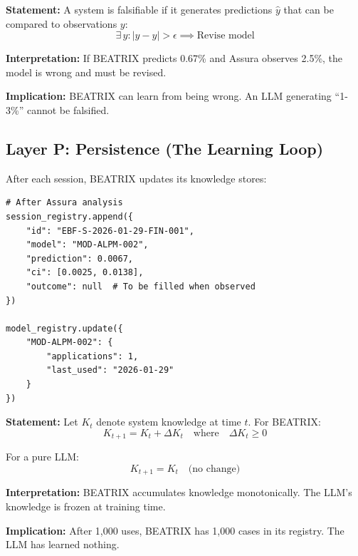 \begin{tcolorbox}[colback=gray!5!white, colframe=gray!75!black,
    title=Axiom UNMAPPED_BX-3: Falsifiability]
\textbf{Statement:} A system is falsifiable if it generates predictions $\hat{y}$ that can be compared to observations $y$:
\begin{equation}
\exists \, y : |y - \hat{y}| > \epsilon \implies \text{Revise model}
\end{equation}

\textbf{Interpretation:} If BEATRIX predicts 0.67\% and Assura observes 2.5\%, the model is wrong and must be revised.

\textbf{Implication:} BEATRIX can learn from being wrong. An LLM generating ``1-3\%'' cannot be falsified.
\end{tcolorbox}


\subsection{Layer P: Persistence (The Learning Loop)}

After each session, BEATRIX updates its knowledge stores:

\begin{verbatim}
# After Assura analysis
session_registry.append({
    "id": "EBF-S-2026-01-29-FIN-001",
    "model": "MOD-ALPM-002",
    "prediction": 0.0067,
    "ci": [0.0025, 0.0138],
    "outcome": null  # To be filled when observed
})

model_registry.update({
    "MOD-ALPM-002": {
        "applications": 1,
        "last_used": "2026-01-29"
    }
})
\end{verbatim}

\begin{tcolorbox}[colback=gray!5!white, colframe=gray!75!black,
    title=Axiom UNMAPPED_BX-4: Cumulative Learning]
\textbf{Statement:} Let $K_t$ denote system knowledge at time $t$. For BEATRIX:
\begin{equation}
K_{t+1} = K_t + \Delta K_t \quad \text{where} \quad \Delta K_t \geq 0
\end{equation}

For a pure LLM:
\begin{equation}
K_{t+1} = K_t \quad \text{(no change)}
\end{equation}

\textbf{Interpretation:} BEATRIX accumulates knowledge monotonically. The LLM's knowledge is frozen at training time.

\textbf{Implication:} After 1,000 uses, BEATRIX has 1,000 cases in its registry. The LLM has learned nothing.
\end{tcolorbox}


